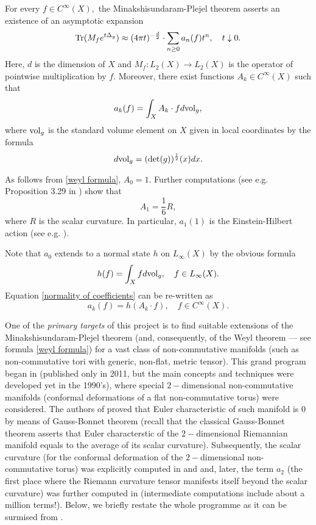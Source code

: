 \documentclass[12pt]{article}
\begin{document}
For every $f\in C^{\infty}(X),$ the Minakshisundaram-Plejel theorem asserts an existence of an asymptotic expansion 
\begin{equation}\label{heat asymptotic}
{\rm Tr}(M_fe^{t\Delta_g})\approx (4\pi t)^{-\frac{d}{2}}\cdot \sum_{n\geq0}a_n(f)t^n,\quad t\downarrow0.
\end{equation}
Here, $d$ is the dimension of $X$ and $M_f:L_2(X)\to L_2(X)$ is the operator of pointwise multiplication by $f.$ Moreover, there exist functions $A_k\in C^{\infty}(X)$ such that
\begin{equation}\label{normality of coefficients}
a_k(f)=\int_X A_k\cdot f d{\rm vol}_g,
\end{equation}
where ${\rm vol}_g$ is the standard volume element on $X$ given in local coordinates by the formula
$$d{\rm vol}_g=({\rm det}(g))^{\frac12}(x)dx.$$

As follows from \eqref{weyl formula}, $A_0=1.$ Further computations (see e.g. Proposition 3.29 in \cite{Rosenberg}) show that
$$A_1=\frac16 R,$$
where $R$ is the scalar curvature. In particular, $a_1(1)$ is the Einstein-Hilbert action (see e.g. \cite{Connes-book}).

Note that $a_0$ extends to a normal state $h$ on $L_{\infty}(X)$ by the obvious formula
$$h(f)=\int_X fd{\rm vol}_g,\quad f\in L_{\infty}(X).$$
Equation \eqref{normality of coefficients} can be re-written as
$$a_k(f)=h(A_k\cdot f),\quad f\in C^{\infty}(X).$$

One of the {\it primary targets} of this project is to find suitable extensions of the Minakshisundaram-Plejel theorem (and, consequently, of the Weyl theorem --- see formula \eqref{weyl formula}) for a vast class of non-commutative manifolds (such as non-commutative tori with generic, non-flat, metric tensor). This grand program began in \cite{ConnesTretkoff} (published only in 2011, but the main concepts and techniques were developed yet in the 1990's), where special $2-$dimensional non-commutative manifolds (conformal deformations of a flat non-commutative torus) were considered. The authors of \cite{ConnesTretkoff} proved that Euler characteristic of such manifold is $0$ by means of Gauss-Bonnet theorem (recall that the classical Gauss-Bonnet theorem asserts that Euler characterstic of the $2-$dimensional Riemannian manifold equals to the average of its scalar curvature). Subsequently, the scalar curvature (for the conformal deformation of the $2-$dimensional non-commutative torus) was explicitly computed in \cite{ConnesMoscovici_curvature} and \cite{FathizadehKhalkhali} and, later, the term $a_2$ (the first place where the Riemann curvature tensor manifests itself beyond the scalar curvature) was further computed in \cite{ConnesFathizadeh} (intermediate computations include about a million terms!). Below, we briefly restate the whole programme as it can be surmised from \cite{ConnesTretkoff}.
\end{document}
